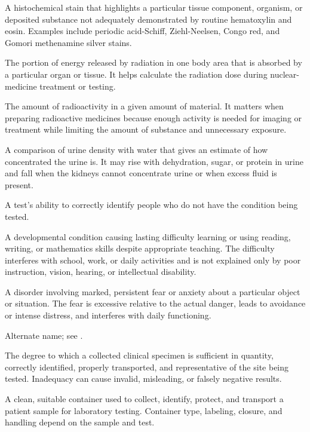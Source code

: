  A histochemical stain that highlights a particular tissue component, organism, or
deposited substance not adequately demonstrated by routine hematoxylin and eosin.
Examples include periodic acid-Schiff, Ziehl-Neelsen, Congo red, and Gomori methenamine
silver stains.

 The portion of energy released by radiation in one body area that is absorbed by a particular organ or tissue. It helps calculate the radiation dose during nuclear-medicine treatment or testing.

 The amount of radioactivity in a given amount of material. It matters when preparing radioactive medicines because enough activity is needed for imaging or treatment while limiting the amount of substance and unnecessary exposure.

 A comparison of urine density with water that gives an estimate of how concentrated the urine is. It may rise with dehydration, sugar, or protein in urine and fall when the kidneys cannot concentrate urine or when excess fluid is present.

 A test's ability to correctly identify people who do not have the condition being tested.

 A developmental condition causing lasting difficulty learning or using reading, writing, or mathematics skills despite appropriate teaching. The difficulty interferes with school, work, or daily activities and is not explained only by poor instruction, vision, hearing, or intellectual disability.

 A disorder involving marked, persistent fear or anxiety about a particular object or situation.
The fear is excessive relative to the actual danger, leads to avoidance or intense distress,
and interferes with daily functioning.

 Alternate name; see .

 The degree to which a collected clinical specimen is sufficient in quantity, correctly
identified, properly transported, and representative of the site being tested.
Inadequacy can cause invalid, misleading, or falsely negative results.

 A clean, suitable container used to collect, identify, protect, and transport a patient sample for laboratory testing. Container type, labeling, closure, and handling depend on the sample and test.

